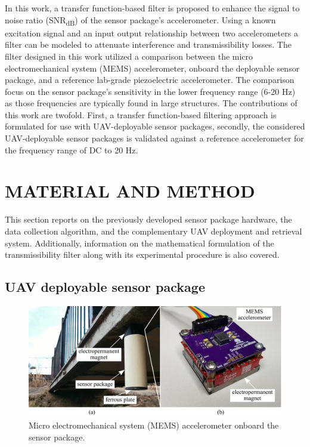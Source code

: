 \documentclass[]{spie}  %
\begin{document}
	
	In this work, a transfer function-based filter is proposed to enhance the signal to noise ratio (SNR\textsubscript{dB}) of the sensor package’s accelerometer. Using a known excitation signal and an input output relationship between two accelerometers a filter can be modeled to attenuate interference and transmissibility losses\cite{BADRI2010}. The filter designed in this work utilized a comparison between the micro electromechanical system (MEMS) accelerometer, onboard the deployable sensor package, and a reference lab-grade piezoelectric accelerometer. The comparison focus on the sensor package's sensitivity in the lower frequency range (6-20 Hz) as those frequencies are typically found in large structures\cite{KARPEL1997}. The contributions of this work are twofold. First, a transfer function-based filtering approach is formulated for use with UAV-deployable sensor packages, secondly,  the considered UAV-deployable sensor packages is validated against a reference accelerometer for the frequency range of DC to 20 Hz.
	


	
	
	\section{MATERIAL AND METHOD}

This section reports on the previously developed sensor package hardware, the data collection algorithm, and the complementary UAV deployment and retrieval system. Additionally, information on the mathematical formulation of the transmissibility filter along with its experimental procedure is also covered.

		\subsection{UAV deployable sensor package}

	\begin{figure} [H]
	\centering
	\includegraphics[width=6 in]{figures/MEMS.png}
	\caption{Micro electromechanical system (MEMS) accelerometer onboard the sensor package.}
	\label{fig:MEMS} 
	\end{figure} 	
	
\end{document}
